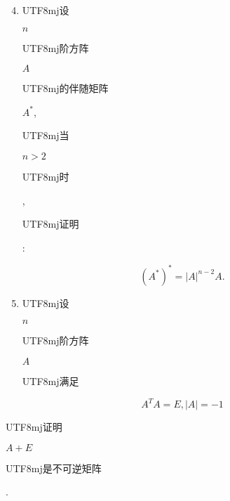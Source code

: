 \documentclass[10pt]{article}
\begin{document}
\begin{enumerate}
  \setcounter{enumi}{3}
  \item \begin{CJK}{UTF8}{mj}设\end{CJK} $n$ \begin{CJK}{UTF8}{mj}阶方阵\end{CJK} $A$ \begin{CJK}{UTF8}{mj}的伴随矩阵\end{CJK} $A^{*}$, \begin{CJK}{UTF8}{mj}当\end{CJK} $n>2$ \begin{CJK}{UTF8}{mj}时\end{CJK}, \begin{CJK}{UTF8}{mj}证明\end{CJK}:
\end{enumerate}
$$
\left(A^{*}\right)^{*}=|A|^{n-2} A .
$$

\begin{enumerate}
  \setcounter{enumi}{4}
  \item \begin{CJK}{UTF8}{mj}设\end{CJK} $n$ \begin{CJK}{UTF8}{mj}阶方阵\end{CJK} $A$ \begin{CJK}{UTF8}{mj}满足\end{CJK}
\end{enumerate}
$$
A^{T} A=E,|A|=-1
$$
\begin{CJK}{UTF8}{mj}证明\end{CJK} $A+E$ \begin{CJK}{UTF8}{mj}是不可逆矩阵\end{CJK}.
\end{document}
